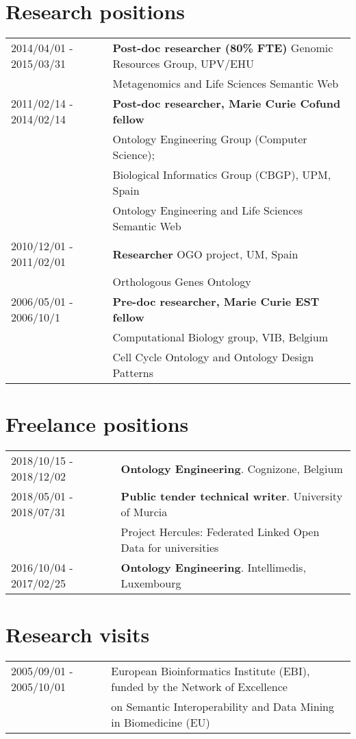 \documentclass[11pt,fullpage]{article}
\begin{document}
\section*{Research positions}
\begin{tabular}{ll}
2014/04/01 - 2015/03/31 & {\bf Post-doc researcher (80\% FTE)} Genomic Resources Group, UPV/EHU  \\
   & Metagenomics and Life Sciences Semantic Web \\
2011/02/14 - 2014/02/14 & {\bf Post-doc researcher, Marie Curie Cofund fellow} \\
     & Ontology Engineering Group (Computer Science); \\
     & Biological Informatics Group (CBGP), UPM, Spain \\
     & Ontology Engineering and Life Sciences Semantic Web \\
2010/12/01 - 2011/02/01 & {\bf Researcher} OGO project, UM, Spain \\
     & Orthologous Genes Ontology \\
2006/05/01 - 2006/10/1 & {\bf Pre-doc researcher, Marie Curie EST fellow} \\
    & Computational Biology group, VIB, Belgium \\
    & Cell Cycle Ontology and Ontology Design Patterns \\
\end{tabular}

\section*{Freelance positions}
\begin{tabular}{ll}

2018/10/15 - 2018/12/02 & {\bf Ontology Engineering}. Cognizone, Belgium\\
2018/05/01 - 2018/07/31 & {\bf Public tender technical writer}. University of Murcia \\
        &  Project Hercules: Federated Linked Open Data for universities\\
2016/10/04 - 2017/02/25 & {\bf Ontology Engineering}. Intellimedis, Luxembourg\\
\end{tabular}

\section*{Research visits}

\begin{tabular}{ll}
 2005/09/01 - 2005/10/01 & European Bioinformatics Institute (EBI), funded by the Network of Excellence \\
      & on Semantic Interoperability and Data Mining in Biomedicine (EU)

\end{tabular}
\end{document}
